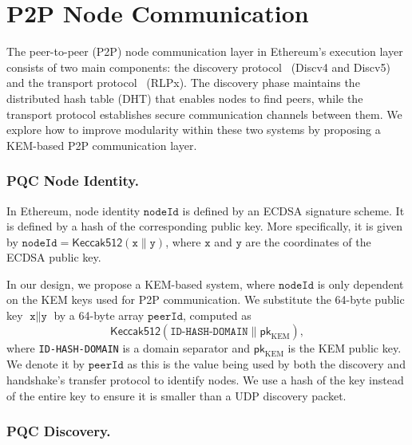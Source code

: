 \section{P2P Node Communication}\label{s:p2p-node-communication}

The peer-to-peer (P2P) node communication layer in Ethereum's execution layer consists of two main components: the discovery protocol~\cite{ethereum_discv4} (Discv4 and Discv5) and the transport protocol~\cite{ethereum_rlpx} (RLPx). 
The discovery phase maintains the distributed hash table (DHT) that enables nodes to find peers, while the transport protocol establishes secure communication channels between them. 
We explore how to improve modularity within these two systems by proposing a KEM-based P2P communication layer.

\subsubsection{PQC Node Identity.}\label{subsubsec:pqc-node-identity}

In Ethereum, node identity $\texttt{nodeId}$ is defined by an ECDSA signature scheme. 
It is defined by a hash of the corresponding public key. 
More specifically, it is given by $\texttt{nodeId} = \mathsf{Keccak512}(\texttt{x}\parallel \texttt{y})$, where $\texttt{x}$ and $\texttt{y}$ are the coordinates of the ECDSA public key.

In our design, we propose a KEM-based system, where $\texttt{nodeId}$ is only dependent on the KEM keys used for P2P communication. 
We substitute the 64-byte public key $\texttt{x}\parallel \texttt{y}$ by a 64-byte array $\texttt{peerId}$, computed as 
\begin{equation}\label{eq:peer-id}
\mathsf{Keccak512}(\texttt{ID-HASH-DOMAIN} \parallel \mathsf{pk}_\text{KEM}),
\end{equation} 
where \texttt{ID-HASH-DOMAIN} is a domain separator and $\mathsf{pk}_\text{KEM}$ is the KEM public key. 
We denote it by $\texttt{peerId}$ as this is the value being used by both the discovery and handshake's transfer protocol to identify nodes. We use a hash of the  key instead of the entire key to ensure it is smaller than a UDP discovery packet.

\subsubsection{PQC Discovery.}\label{subsubsec:pqc-discovery}


